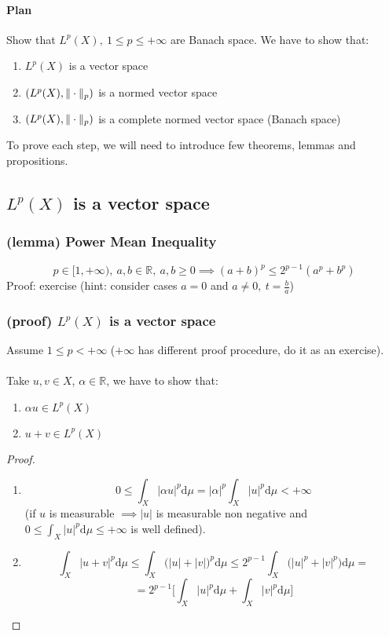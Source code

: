 \paragraph{Plan} Show that $L^p(X),\ 1\leq p\leq +\infty$ are Banach space.
We have to show that:
\begin{enumerate}
    \item $L^p(X)$ is a vector space
    \item $(L^p(X),\Vert \cdot \Vert_p)$ is a normed vector space
    \item $(L^p(X),\Vert \cdot \Vert_p)$ is a complete normed vector space (Banach space)
\end{enumerate}
To prove each step, we will need to introduce few theorems, lemmas and propositions.
\subsection{$L^p(X)$ is a vector space}
\subsubsection{(lemma) Power Mean Inequality}
$$p\in [1,+\infty), \ a,b\in \mathbb R, \ a,b\geq 0 \implies (a+b)^p\leq 2^{p-1}(a^p+b^p)$$
Proof: exercise (hint: consider cases $a=0$ and $a\neq 0, \ t=\frac ba$)
\subsubsection{(proof) $L^p(X)$ is a vector space}
Assume $1\leq p< +\infty$ ($+\infty$ has different proof procedure, do it as an exercise).
\\ \ \\
Take $u,v\in X$, $\alpha\in\mathbb R$, we have to show that:
\begin{enumerate}
    \item $\alpha u\in L^p(X)$
    \item $u+v\in L^p(X)$
\end{enumerate}
\begin{proof}\ 
\begin{enumerate}
    \item $$0\leq \int_X|\alpha u|^p\mathrm d\mu=|\alpha|^p\int_X |u|^p\mathrm d\mu <+\infty$$
(if $u$ is measurable $\implies |u|$ is measurable non negative and $0\leq \int_X|u|^p\mathrm d\mu\leq +\infty$ is well defined).
\item $$\int_X|u+v|^p\mathrm d\mu\leq \int_X\Big(|u|+|v|\Big)^p\mathrm d\mu\leq 2^{p-1}\int_X\Big ( |u|^p+|v|^p\Big ) \mathrm d\mu=$$
$$=2^{p-1}\Big [\int_X |u|^p\mathrm d\mu +\int_X |v|^p\mathrm d\mu\Big]$$
\end{enumerate}
\end{proof}

